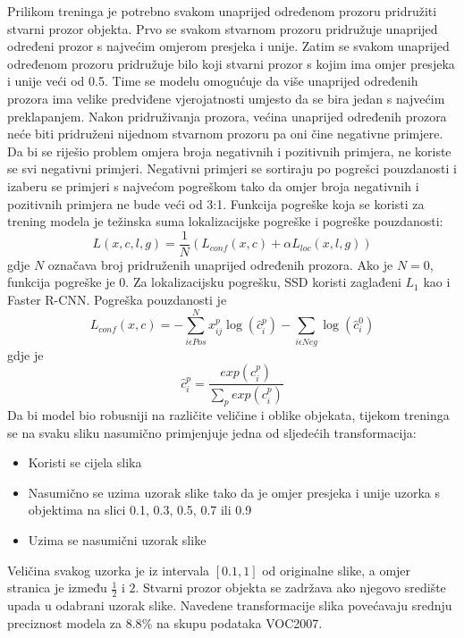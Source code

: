Prilikom treninga je potrebno svakom unaprijed određenom prozoru pridružiti stvarni prozor objekta. Prvo se svakom stvarnom prozoru pridružuje unaprijed određeni prozor s najvećim omjerom presjeka i unije. Zatim se svakom unaprijed određenom prozoru pridružuje bilo koji stvarni prozor s kojim ima omjer presjeka i unije veći od 0.5. Time se modelu omogućuje da više unaprijed određenih prozora ima velike predviđene vjerojatnosti umjesto da se bira jedan s najvećim preklapanjem.
Nakon pridruživanja prozora, većina unaprijed određenih prozora neće biti pridruženi nijednom stvarnom prozoru pa oni čine negativne primjere. Da bi se riješio problem omjera broja negativnih i pozitivnih primjera, ne koriste se svi negativni primjeri. Negativni primjeri se sortiraju po pogrešci pouzdanosti i izaberu se primjeri s najvećom pogreškom tako da omjer broja negativnih i pozitivnih primjera ne bude veći od 3:1. 
Funkcija pogreške koja se koristi za trening modela je težinska suma lokalizacijske pogreške i pogreške pouzdanosti:
\[
	L(x, c, l, g) = \frac{1}{N}(L_{conf}(x, c) + \alpha L_{loc}(x, l, g))
\]
gdje $N$ označava broj pridruženih unaprijed određenih prozora. Ako je $N = 0$, funkcija pogreške je 0. Za lokalizacijsku pogrešku, SSD koristi zaglađeni $L_1$ kao i Faster R-CNN. Pogreška pouzdanosti je
\[
	L_{conf}(x, c) = - \sum\limits_{i \epsilon Pos}^N x^p_{ij}\log(\hat{c}^p_i) - \sum\limits_{i \epsilon Neg} \log(\hat{c}^0_i)
\]
gdje je 
\[
	\hat{c}^p_i = \frac{exp(c_i^p)}{\sum\limits_p exp(c_i^p)}
\]
Da bi model bio robusniji na različite veličine i oblike objekata, tijekom treninga se na svaku sliku nasumično primjenjuje jedna od sljedećih transformacija:
\begin{itemize}
	\item Koristi se cijela slika
	\item Nasumično se uzima uzorak slike tako da je omjer presjeka i unije uzorka s objektima na slici 0.1, 0.3, 0.5, 0.7 ili 0.9
	\item Uzima se nasumični uzorak slike
\end{itemize}
Veličina svakog uzorka je iz intervala $[0.1, 1]$ od originalne slike, a omjer stranica je između $\frac{1}{2}$ i $2$. Stvarni prozor objekta se zadržava ako njegovo središte upada u odabrani uzorak slike. 
Navedene transformacije slika povećavaju srednju preciznost modela za $8.8\%$ na skupu podataka VOC2007.